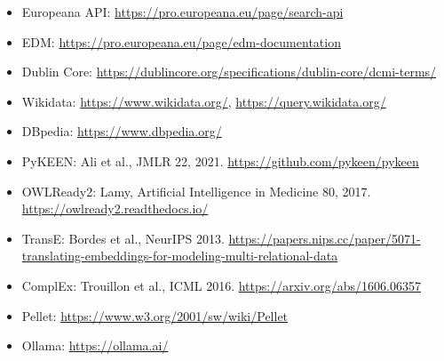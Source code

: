 \documentclass[11pt,a4paper]{article}
\begin{document}
\begin{itemize}
\item Europeana API: \url{https://pro.europeana.eu/page/search-api}
\item EDM: \url{https://pro.europeana.eu/page/edm-documentation}
\item Dublin Core: \url{https://dublincore.org/specifications/dublin-core/dcmi-terms/}
\item Wikidata: \url{https://www.wikidata.org/}, \url{https://query.wikidata.org/}
\item DBpedia: \url{https://www.dbpedia.org/}
\item PyKEEN: Ali et al., JMLR 22, 2021. \url{https://github.com/pykeen/pykeen}
\item OWLReady2: Lamy, Artificial Intelligence in Medicine 80, 2017. \url{https://owlready2.readthedocs.io/}
\item TransE: Bordes et al., NeurIPS 2013. \url{https://papers.nips.cc/paper/5071-translating-embeddings-for-modeling-multi-relational-data}
\item ComplEx: Trouillon et al., ICML 2016. \url{https://arxiv.org/abs/1606.06357}
\item Pellet: \url{https://www.w3.org/2001/sw/wiki/Pellet}
\item Ollama: \url{https://ollama.ai/}
\end{itemize}
\end{document}
